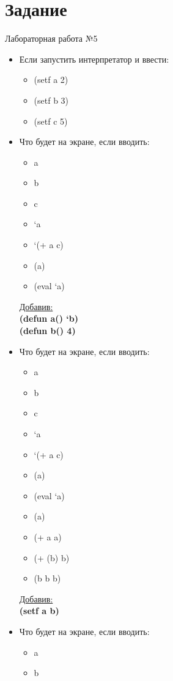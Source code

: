 \newpage
\section*{Задание}
\Large{Лабораторная работа №5}

\begin{itemize}
	\item Если запустить интерпретатор и ввести:
		\begin{itemize}
			\item (setf  a 2)
			\item (setf b 3)
			\item (setf c 5)
		\end{itemize}
	\item Что будет на экране, если вводить:
		\begin{itemize}
			\item a
			\item b
			\item c
			\item ‘a
			\item ‘(+ a c)
			\item (a)
			\item (eval ‘a)
		\end{itemize}
	\underline{Добавив:}\\
	\textbf{(defun a() ‘b) }\\
	\textbf{(defun b() 4)}
	\item Что будет на экране, если вводить:
		\begin{itemize}
			\item a
			\item b 
			\item c
			\item ‘a
			\item ‘(+ a c)
			\item (a)
			\item (eval ‘a)
			\item (a)
			\item (+ a a)
			\item (+ (b) b)
			\item (b b b)
		\end{itemize}
	\underline{Добавив:}\\
	\textbf{(setf a b)}
	\item Что будет на экране, если вводить:
		\begin{itemize}
			\item a
			\item b 

\end{itemize}
\end{itemize}
